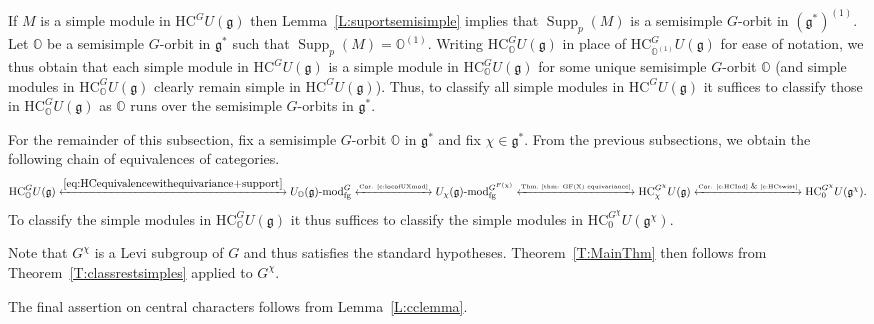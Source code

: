 \documentclass[twoside,12pt,reqno]{amsart}
\theoremstyle{remark}
\numberwithin{equation}{section}
\def\lmod{\!\operatorname{-mod}}
\def\Supp{\operatorname{Supp}}
\def\O{{\mathbb O}}
\def\HC{\mathrm{HC}}
\def\g{{\mathfrak g}}
\newcommand{\fg}{\operatorname{fg}}
\begin{document}
If $M$ is a simple module in $\HC^G U(\g)$ then Lemma~\ref{L:suportsemisimple} implies that $\Supp_p(M)$ is a semisimple $G$-orbit in $(\g^*)^{(1)}$. Let $\O$ be a semisimple $G$-orbit in $\g^*$ such that $\Supp_p(M)=\O^{(1)}$. Writing $\HC_\O^G U(\g)$ in place of $\HC_{\O^{(1)}}^G U(\g)$ for ease of notation, we thus obtain that each simple module in $\HC^G U(\g)$ is a simple module in $\HC^G_{\O} U(\g)$ for some unique semisimple $G$-orbit $\O$ (and simple modules in $\HC^G_{\O} U(\g)$ clearly remain simple in $\HC^G U(\g)$). Thus, to classify all simple modules in $\HC^G U(\g)$ it suffices to classify those in $\HC^G_\O U(\g)$ as $\O$ runs over the semisimple $G$-orbits in $\g^*$. 

For the remainder of this subsection, fix a semisimple $G$-orbit $\O$ in $\g^*$ and fix $\chi\in \g^*$. From the previous subsections, we obtain the following chain of equivalences of categories.
$$\HC^G_\O U(\g)\xleftrightarrow{\eqref{eq:HCequivalencewithequivariance+support}} U_\O(\g)\lmod_{\fg}^{G} \xleftrightarrow{\tiny\mbox{Cor. } \ref{c:locofUXmod} } U_\chi(\g)\lmod_{\fg}^{G^{F(\chi)}}\xleftrightarrow{\tiny\mbox{Thm.}~\ref{thm: GF(X) equivariance}} \HC_\chi^{G^\chi}U(\g)\xleftrightarrow{\tiny\mbox{Cor. }\ref{c:HCInd} \ \&\ \ref{c:HCtwist}} \HC_0^{G^\chi} U(\g^\chi).$$ To classify the simple modules in $\HC^G_\O U(\g)$ it thus suffices to classify the simple modules in $\HC_0^{G^\chi} U(\g^\chi)$.

Note that $G^\chi$ is a Levi subgroup of $G$ and thus satisfies the standard hypotheses. Theorem~\ref{T:MainThm} then follows from Theorem~\ref{T:classrestsimples} applied to $G^\chi$.

The final assertion on central characters follows from Lemma~\ref{L:cclemma}.
 
\end{document}
